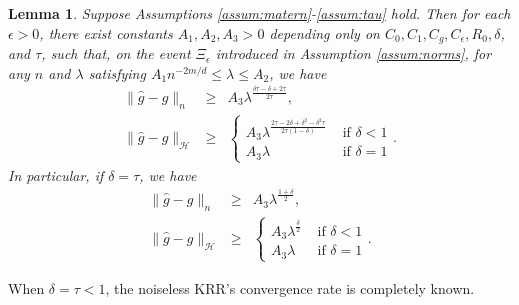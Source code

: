 \documentclass[12pt]{article}
\theoremstyle{plain}
\newtheorem{lemma}{Lemma}
\theoremstyle{remark}
\begin{document}
\begin{lemma}\label{Th:KRRlower}
       Suppose Assumptions \ref{assum:matern}-\ref{assum:tau} hold. Then for each $\epsilon>0$, there exist constants $A_1,A_2,A_3>0$ depending only on $C_0,C_1,C_g,C_\epsilon,R_0,\delta$, and $\tau$, such that, on the event $\Xi_\epsilon$ introduced in Assumption \ref{assum:norms}, for any $n$ and $\lambda$ satisfying $A_1n^{-2m/d}\leq \lambda \leq A_2$, we have
       \begin{eqnarray}
           \|\hat{g}-g\|_n&\geq& A_3 \lambda^{\frac{\delta\tau-\delta+2\tau}{2\tau}},\label{KRRlowern}\\
            \|\hat{g}-g\|_\mathcal{H}&\geq& 
            \begin{cases}
                A_3 \lambda^{\frac{2\tau-2\delta+\delta^2-\delta^2\tau}{2\tau(1-\delta)}} & \text{ if } \delta<1\\
                A_3 \lambda     & \text{ if } \delta=1
            \end{cases}.\label{KRRlowerH}
       \end{eqnarray}
       In particular, if $\delta=\tau$, we have       
       \begin{eqnarray}
           \|\hat{g}-g\|_n&\geq& A_3 \lambda^{\frac{1+\delta}{2}},\nonumber\\
           \|\hat{g}-g\|_\mathcal{H}&\geq& 
           \begin{cases}
               A_3 \lambda^{\frac{\delta}{2}} & \text{ if } \delta<1\\
               A_3 \lambda& \text{ if } \delta=1
           \end{cases}.\label{KRRlowerHequal}
       \end{eqnarray}
\end{lemma}

When $\delta=\tau<1$, the noiseless KRR's convergence rate is completely known. 
\end{document}
